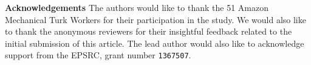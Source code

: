 






\vspace*{4mm}
\noindent\textbf{Acknowledgements} The authors would like to thank the 51 Amazon Mechanical Turk Workers for their participation in the study. We would also like to thank the anonymous reviewers for their insightful feedback related to the initial submission of this article. The lead author would also like to acknowledge support from the EPSRC, grant number \texttt{1367507}.

%
 






%
%



